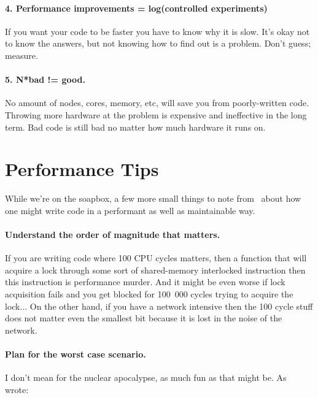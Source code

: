 \documentclass[a4paper]{report}
\begin{document}
\paragraph{4. Performance improvements = log(controlled experiments)}
If you want your code to be faster you have to know why it is slow. It's okay not to know the answers, but not knowing how to find out is a problem. Don't guess; measure.


\paragraph{5. N*bad != good.}
No amount of nodes, cores, memory, etc, will save you from poorly-written code. Throwing more hardware at the problem is expensive and ineffective in the long term. Bad code is still bad no matter how much hardware it runs on. 

\section*{Performance Tips}

While we're on the soapbox, a few more small things to note from~\cite{preopt} about how one might write code in a performant as well as maintainable way.

\paragraph{Understand the order of magnitude that matters.} If you are writing code where 100 CPU cycles matters, then a function that will acquire a lock through some sort of shared-memory interlocked instruction then this instruction is performance murder. And it might be even worse if lock acquisition fails and you get blocked for 100~000 cycles trying to acquire the lock... On the other hand, if you have a network intensive then the 100 cycle stuff does not matter even the smallest bit because it is lost in the noise of the network.

\paragraph{Plan for the worst case scenario.} I don't mean for the nuclear apocalypse, as much fun as that might be. As~\cite{preopt} wrote:
\end{document}
